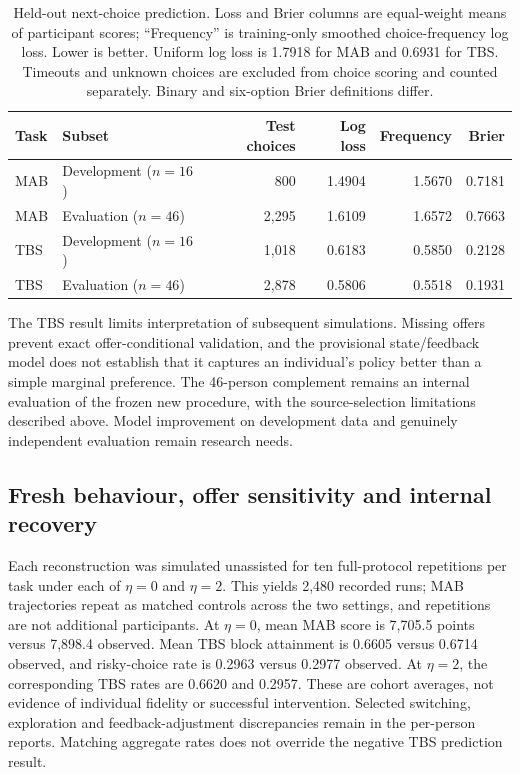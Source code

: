 \documentclass[11pt,a4paper]{article}
\begin{document}
\begin{table}[htbp]
\centering\small
\begin{tabularx}{\linewidth}{@{}lYrrrr@{}}
\toprule
Task & Subset & Test choices & Log loss & Frequency & Brier \\
\midrule
MAB & Development ($n=16$) & 800 & 1.4904 & 1.5670 & 0.7181 \\
MAB & Evaluation ($n=46$) & 2,295 & 1.6109 & 1.6572 & 0.7663 \\
TBS & Development ($n=16$) & 1,018 & 0.6183 & 0.5850 & 0.2128 \\
TBS & Evaluation ($n=46$) & 2,878 & 0.5806 & 0.5518 & 0.1931 \\
\bottomrule
\end{tabularx}
\caption{Held-out next-choice prediction. Loss and Brier columns are equal-weight means of participant scores; ``Frequency'' is training-only smoothed choice-frequency log loss. Lower is better. Uniform log loss is 1.7918 for MAB and 0.6931 for TBS. Timeouts and unknown choices are excluded from choice scoring and counted separately. Binary and six-option Brier definitions differ.}
\label{tab:heldout}
\end{table}

The TBS result limits interpretation of subsequent simulations. Missing offers prevent exact offer-conditional validation, and the provisional state/feedback model does not establish that it captures an individual's policy better than a simple marginal preference. The 46-person complement remains an internal evaluation of the frozen new procedure, with the source-selection limitations described above. Model improvement on development data and genuinely independent evaluation remain research needs.

\subsection{Fresh behaviour, offer sensitivity and internal recovery}
Each reconstruction was simulated unassisted for ten full-protocol repetitions per task under each of $\eta=0$ and $\eta=2$. This yields 2,480 recorded runs; MAB trajectories repeat as matched controls across the two settings, and repetitions are not additional participants. At $\eta=0$, mean MAB score is 7,705.5 points versus 7,898.4 observed. Mean TBS block attainment is 0.6605 versus 0.6714 observed, and risky-choice rate is 0.2963 versus 0.2977 observed. At $\eta=2$, the corresponding TBS rates are 0.6620 and 0.2957. These are cohort averages, not evidence of individual fidelity or successful intervention. Selected switching, exploration and feedback-adjustment discrepancies remain in the per-person reports. Matching aggregate rates does not override the negative TBS prediction result.
\end{document}
